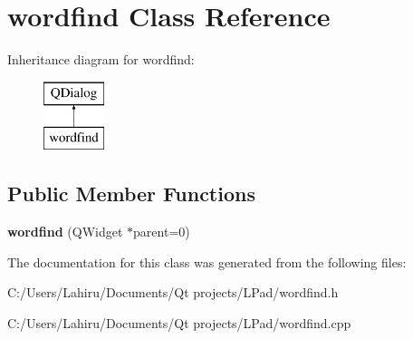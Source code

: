 \hypertarget{classwordfind}{}\section{wordfind Class Reference}
\label{classwordfind}
Inheritance diagram for wordfind\+:\begin{figure}[H]
\begin{center}
\leavevmode
\includegraphics[height=2.000000cm]{classwordfind}
\end{center}
\end{figure}
\subsection*{Public Member Functions}
\begin{DoxyCompactItemize}
\item 
\hypertarget{classwordfind_a9f53971bfab9ec3ea7480c5eec5c79fc}{}{\bfseries wordfind} (Q\+Widget $\ast$parent=0)\label{classwordfind_a9f53971bfab9ec3ea7480c5eec5c79fc}

\end{DoxyCompactItemize}


The documentation for this class was generated from the following files\+:\begin{DoxyCompactItemize}
\item 
C\+:/\+Users/\+Lahiru/\+Documents/\+Qt projects/\+L\+Pad/wordfind.\+h\item 
C\+:/\+Users/\+Lahiru/\+Documents/\+Qt projects/\+L\+Pad/wordfind.\+cpp\end{DoxyCompactItemize}
